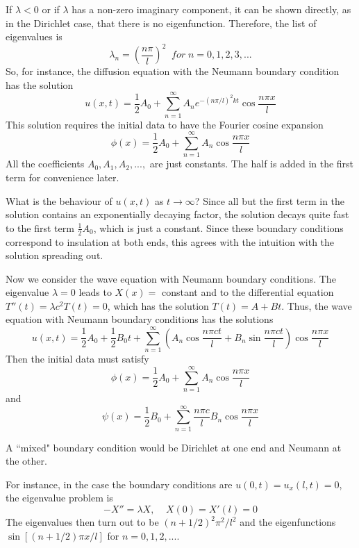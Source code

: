 If $\lambda < 0$ or if $\lambda$ has a non-zero imaginary component, it can be shown directly, as in the Dirichlet case, that there is no eigenfunction. Therefore, the list of eigenvalues is \begin{equation}
    \boxed{\lambda_n = \left(\frac{n\pi}{l}\right)^2\;\;for\;n = 0,1,2,3,...}
\end{equation}
So, for instance, the diffusion equation with the Neumann boundary condition has the solution \begin{equation}
    u(x,t) = \frac{1}{2}A_0 + \sum_{n=1}^{\infty}A_ne^{-(n\pi/l)^2kt}\cos\frac{n\pi x}{l}
\end{equation}
This solution requires the initial data to have the Fourier cosine expansion \begin{equation}
    \phi(x) = \frac{1}{2}A_0+\sum_{n=1}^{\infty}A_n\cos\frac{n\pi x}{l}
\end{equation}
All the coefficients $A_0,A_1,A_2,...,$ are just constants. The half is added in the first term for convenience later.

What is the behaviour of $u(x,t)$ as $t\rightarrow \infty$? Since all but the first term in the solution contains an exponentially decaying factor, the solution decays quite fast to the first term $\frac{1}{2}A_0$, which is just a constant. Since these boundary conditions correspond to insulation at both ends, this agrees with the intuition with the solution spreading out. 

Now we consider the wave equation with Neumann boundary conditions. The eigenvalue $\lambda = 0$ leads to $X(x) = $ constant and to the differential equation $T''(t) = \lambda c^2T(t) = 0$, which has the solution $T(t) = A+Bt$. Thus, the wave equation with Neumann boundary conditions has the solutions \begin{equation}
    \boxed{u(x,t) = \frac{1}{2}A_0+\frac{1}{2}B_0t+\sum_{n=1}^{\infty}\left(A_n\cos\frac{n\pi ct}{l}+B_n\sin\frac{n\pi ct}{l}\right)\cos\frac{n\pi x}{l}}
\end{equation}
Then the initial data must satisfy \begin{equation}
    \phi(x) = \frac{1}{2}A_0+\sum_{n=1}^{\infty}A_n\cos\frac{n\pi x}{l}
\end{equation}
and \begin{equation}
    \psi(x) = \frac{1}{2}B_0+\sum_{n=1}^{\infty}\frac{n\pi c}{l}B_n\cos\frac{n\pi x}{l}
\end{equation}

\begin{definition}
    A ``mixed" boundary condition would be Dirichlet at one end and Neumann at the other.
\end{definition}
For instance, in the case the boundary conditions are $u(0,t) = u_x(l,t) = 0$, the eigenvalue problem is \begin{equation}
    -X''=\lambda X,\;\;\;\;X(0) = X'(l) = 0
\end{equation}
The eigenvalues then turn out to be $(n+1/2)^2\pi^2/l^2$ and the eigenfunctions $\sin[(n+1/2)\pi x/l]$ for $n = 0,1,2,...$.


